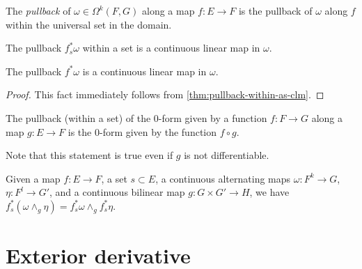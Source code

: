 \begin{definition}%
  \label{def:pullback-space}
  The \emph{pullback} of \(\omega\in \Omega^{k}(F, G)\) along a map \(f\colon E\to F\)
  is the pullback of \(\omega\) along \(f\) within the universal set in the domain.
\end{definition}

\begin{theorem}%
  \label{thm:pullback-within-as-clm}
  The pullback \(f_{s}^{*}\omega\) within a set is a continuous linear map in \(\omega\).
\end{theorem}

\begin{theorem}%
  \label{thm:pullback-as-clm}
  The pullback \(f^{*}\omega\) is a continuous linear map in \(\omega\).
\end{theorem}

\begin{proof}
  This fact immediately follows from \autoref{thm:pullback-within-as-clm}.
\end{proof}

\begin{theorem}
  The pullback (within a set) of the \(0\)-form given by a function \(f\colon F\to G\) along a map \(g\colon E\to F\)
  is the \(0\)-form given by the function \(f\circ g\).

  Note that this statement is true even if \(g\) is not differentiable.
\end{theorem}


\begin{lemma}%
  \label{lem:pullback-within-wedge}
  Given a map \(f\colon E\to F\), a set \(s \subset E\), a continuous alternating maps \(\omega\colon F^{k}\to G\), \(\eta\colon F^{l}\to G'\), and a continuous bilinear map \(g\colon G\times G' \to H\),
  we have \(f_{s}^{*}(\omega \wedge_{g}\eta) = f_{s}^{*}\omega\wedge_{g}f_{s}^{*}\eta\).
\end{lemma}

\section{Exterior derivative}%
\label{sec:exterior-derivative}

